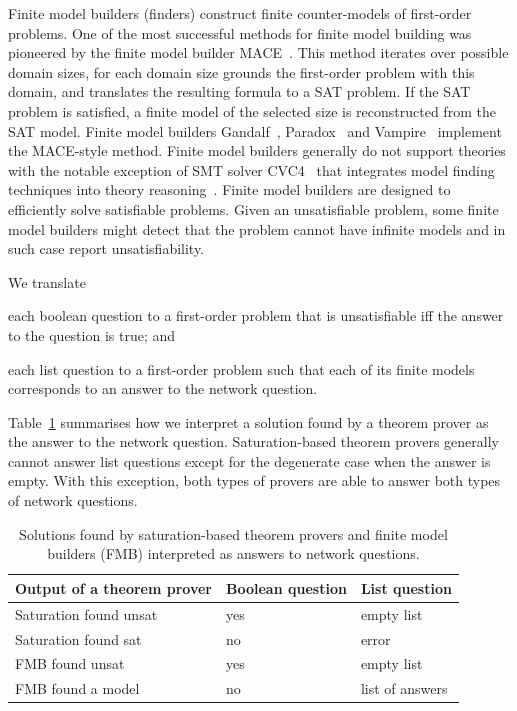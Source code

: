 Finite model builders (finders) construct finite counter-models of first-order problems. One of the most successful methods for finite model building was pioneered by the finite model builder MACE~\cite{mccune1994davis}. This method iterates over possible domain sizes, for each domain size grounds the first-order problem with this domain, and translates the resulting formula to a SAT problem. If the SAT problem is satisfied, a finite model of the selected size is reconstructed from the SAT model. Finite model builders Gandalf~\cite{Gandalf}, Paradox~\cite{claessen2003new} and Vampire~\cite{VampireFMB} implement the MACE-style method. Finite model builders generally do not support theories with the notable exception of SMT solver CVC4~\cite{CVC4} that integrates model finding techniques into theory reasoning~\cite{CVC4FMB}. Finite model builders are designed to efficiently solve satisfiable problems. Given an unsatisfiable problem, some finite model builders might detect that the problem cannot have infinite models and in such case report unsatisfiability.

We translate
\begin{enumerate*}[label=(\roman*)]
  \item each boolean question to a first-order problem that is unsatisfiable iff the answer to the question is true; and
  \item each list question to a first-order problem such that each of its finite models corresponds to an answer to the network question.
\end{enumerate*}
Table~\ref{fig:fol-answering-questions} summarises how we interpret a solution found by a theorem prover as the answer to the network question. Saturation-based theorem provers generally cannot answer list questions except for the degenerate case when the answer is empty. With this exception, both types of provers are able to answer both types of network questions. 

\begin{table}
  \center
  \begin{tabular}{lll}
    \hline
    Output of a theorem prover & Boolean question & List question \\
    \hline
    Saturation found unsat & yes & empty list \\
    Saturation found sat   & no  & error \\
    FMB found unsat        & yes & empty list \\
    FMB found a model      & no  & list of answers \\
  \end{tabular}
  \caption{Solutions found by saturation-based theorem provers and finite model builders (FMB) interpreted as answers to network questions.}
  \label{fig:fol-answering-questions}
\end{table}

